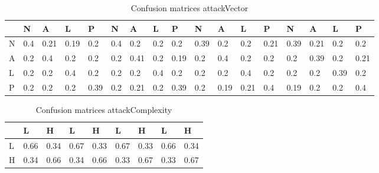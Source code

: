 \documentclass[11pt]{article}
\begin{document}
\begin{table}
	\caption{Confusion matrices attackVector}
	\label{table:mitre-attackVector}
	\begin{center}
		\begin{tabular}{l|l|l|l|l|l|l|l|l|l|l|l|l|l|l|l|l}\textbf{} & \textbf{N} & \textbf{A} & \textbf{L} & \textbf{P} & \textbf{N} & \textbf{A} & \textbf{L} & \textbf{P} & \textbf{N} & \textbf{A} & \textbf{L} & \textbf{P} & \textbf{N} & \textbf{A} & \textbf{L} & \textbf{P} \\
               \hline
               N                                            & 0.4        & 0.21       & 0.19       & 0.2        & 0.4        & 0.2        & 0.2        & 0.2        & 0.39       & 0.2        & 0.2        & 0.21       & 0.39       & 0.21       & 0.2        & 0.2        \\
               A                                            & 0.2        & 0.4        & 0.2        & 0.2        & 0.2        & 0.41       & 0.2        & 0.19       & 0.2        & 0.4        & 0.2        & 0.2        & 0.2        & 0.39       & 0.2        & 0.21       \\
               L                                            & 0.2        & 0.2        & 0.4        & 0.2        & 0.2        & 0.2        & 0.4        & 0.2        & 0.2        & 0.2        & 0.4        & 0.2        & 0.2        & 0.2        & 0.39       & 0.2        \\
               P                                            & 0.2        & 0.2        & 0.2        & 0.39       & 0.2        & 0.21       & 0.2        & 0.39       & 0.2        & 0.19       & 0.21       & 0.4        & 0.19       & 0.2        & 0.2        & 0.4        \\
		\end{tabular}
	\end{center}
\end{table}


\begin{table}
	\caption{Confusion matrices attackComplexity}
	\label{table:mitre-attackComplexity}
	\begin{center}
		\begin{tabular}{l|l|l|l|l|l|l|l|l}\textbf{} & \textbf{L} & \textbf{H} & \textbf{L} & \textbf{H} & \textbf{L} & \textbf{H} & \textbf{L} & \textbf{H} \\
               \hline
               L                            & 0.66       & 0.34       & 0.67       & 0.33       & 0.67       & 0.33       & 0.66       & 0.34       \\
               H                            & 0.34       & 0.66       & 0.34       & 0.66       & 0.33       & 0.67       & 0.33       & 0.67       \\
		\end{tabular}
	\end{center}
\end{table}
\end{document}
